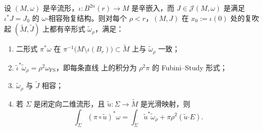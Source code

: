 \begin{proposition}\label{prop:9-3-3}
设 $(M,\omega)$ 是辛流形，$\iota:B^{2n}(r)\to M$ 是辛嵌入，而
$J\in\mathcal J(M,\omega)$ 是满足 $\iota^*J=J_0$ 的 $\omega$-相容殆复结构。则对每个
$\rho<r$，$(M,J)$ 在 $x_0:=\iota(0)$ 处的复吹起
$(\widetilde M,\widetilde J)$ 上都有辛形式 $\widetilde\omega_\rho$，满足：
\begin{enumerate}[label=(\roman*),leftmargin=3em]
\item 二形式 $\pi^*\omega$ 在
$\pi^{-1}\bigl(M\setminus\iota(B_r)\bigr)\subset\widetilde M$ 上与
$\widetilde\omega_\rho$ 一致；
\item $\widetilde\iota^*\widetilde\omega_\rho=\rho^2\omega_{\mathrm{FS}}$，即每条直线
上的积分为 $\rho^2\pi$ 的 Fubini--Study 形式；
\item $\widetilde\omega_\rho$ 与 $\widetilde J$ 相容；
\item 若 $\Sigma$ 是闭定向二维流形，且
$\widetilde u:\Sigma\to\widetilde M$ 是光滑映射，则
\[
  \int_\Sigma(\pi\circ\widetilde u)^*\omega
  =\int_\Sigma\widetilde u^*\widetilde\omega_\rho
   +\pi\rho^2(\widetilde u\mathbin{\boldsymbol\cdot}E).
\]
\end{enumerate}
\end{proposition}

